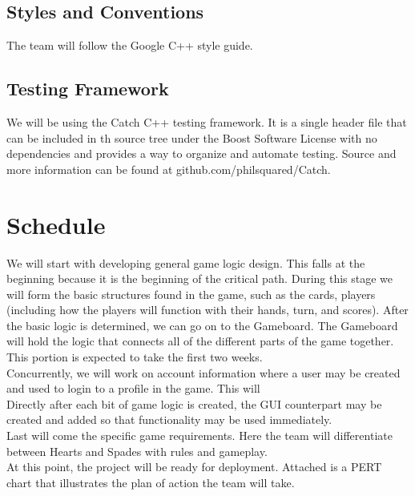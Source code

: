 \documentclass[11pt, titlepage]{article}
\begin{document}
    \subsection{Styles and Conventions}
    	The team will follow the Google C++ style guide.

    \subsection{Testing Framework}
    	We will be using the Catch C++ testing framework.  It is a single header file that can be included in th source tree under the Boost Software License with no dependencies and provides a way to organize and automate testing.  Source and more information can be found at github.com/philsquared/Catch.

    \section{Schedule}

	\tab We will start with developing general game logic design.  This falls at the beginning because it is the beginning of the critical path.  During this stage we will form the basic structures found in the game, such as the cards, players (including how the players will function with their hands, turn, and scores).
	After the basic logic is determined, we can go on to the Gameboard.  The Gameboard will hold the logic that connects all of the different parts of the game together.  This portion is expected to take the first two weeks.\\

Concurrently, we will work on account information where a user may be created and used to login to a profile in the game. This will \\

Directly after each bit of game logic is created, the GUI counterpart may be created and added so that functionality may be used immediately.\\

Last will come the specific game requirements.  Here the team will differentiate between Hearts and Spades with rules and gameplay.\\

At this point, the project will be ready for deployment.  Attached is a PERT chart that illustrates the plan of action the team will take.
\end{document}
